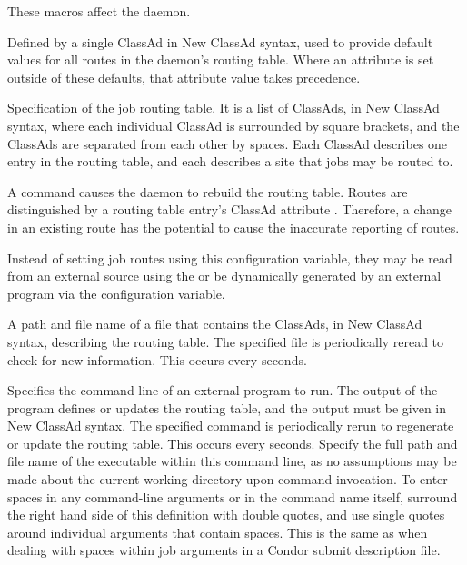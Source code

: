 These macros affect the  daemon.

\begin{description}

\label{param:JobRouterDefaults}
\item[\Macro{JOB\_ROUTER\_DEFAULTS}]
  Defined by a single ClassAd in New ClassAd syntax, 
  used to provide default values for all routes in the 
  daemon's routing table.
  Where an attribute is set outside of these defaults,
  that attribute value takes precedence.

\label{param:JobRouterEntries}
\item[\Macro{JOB\_ROUTER\_ENTRIES}]
  Specification of the job routing table.  It is a list of ClassAds,
  in New ClassAd syntax,
  where each individual ClassAd is surrounded by square brackets,
  and the ClassAds are separated from each other by spaces.
  Each ClassAd describes one entry in the routing table,
  and each describes a site that jobs may be routed to.

  A  command causes the  daemon
  to rebuild the routing table.
  Routes are distinguished by a routing table entry's ClassAd attribute
  .
  Therefore, a  change in an existing route has the potential to
  cause the inaccurate reporting of routes.

  Instead of setting job routes using this configuration variable,
  they may be read from an
  external source using the  or
  be dynamically generated by an external program via the
   configuration variable.


\label{param:JobRouterEntriesFile}
\item[\Macro{JOB\_ROUTER\_ENTRIES\_FILE}]
  A path and file name of a file that contains the ClassAds,
  in New ClassAd syntax, describing the routing table.
  The specified file is periodically reread to check for new information.
  This occurs every  seconds.

\label{param:JobRouterEntriesCmd}
\item[\Macro{JOB\_ROUTER\_ENTRIES\_CMD}]
  Specifies the command line of an external program
  to run.  The output of the program defines or updates the routing table,
  and the output must be given in New ClassAd syntax.
  The specified command is periodically rerun to regenerate or update
  the routing table.
  This occurs every  seconds.
  Specify the full path and file name of the executable within this
  command line, as no assumptions may be made about the current working
  directory upon command invocation.
  To enter spaces in any command-line arguments or in the command name itself,
  surround the right hand side of this definition with double quotes,
  and use single quotes around individual arguments that contain spaces.
  This is the same as when dealing with spaces within job arguments
  in a Condor submit description file. 


\end{description}
